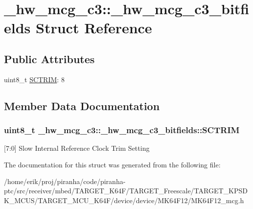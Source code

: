 \hypertarget{struct__hw__mcg__c3_1_1__hw__mcg__c3__bitfields}{}\section{\+\_\+hw\+\_\+mcg\+\_\+c3\+:\+:\+\_\+hw\+\_\+mcg\+\_\+c3\+\_\+bitfields Struct Reference}
\label{struct__hw__mcg__c3_1_1__hw__mcg__c3__bitfields}
\subsection*{Public Attributes}
\begin{DoxyCompactItemize}
\item 
uint8\+\_\+t \hyperlink{struct__hw__mcg__c3_1_1__hw__mcg__c3__bitfields_a3ddb5eccda673979cc87be98d8116d80}{S\+C\+T\+R\+IM}\+: 8
\end{DoxyCompactItemize}


\subsection{Member Data Documentation}
\subsubsection[{\texorpdfstring{S\+C\+T\+R\+IM}{SCTRIM}}]{\setlength{\rightskip}{0pt plus 5cm}uint8\+\_\+t \+\_\+hw\+\_\+mcg\+\_\+c3\+::\+\_\+hw\+\_\+mcg\+\_\+c3\+\_\+bitfields\+::\+S\+C\+T\+R\+IM}\hypertarget{struct__hw__mcg__c3_1_1__hw__mcg__c3__bitfields_a3ddb5eccda673979cc87be98d8116d80}{}\label{struct__hw__mcg__c3_1_1__hw__mcg__c3__bitfields_a3ddb5eccda673979cc87be98d8116d80}
\mbox{[}7\+:0\mbox{]} Slow Internal Reference Clock Trim Setting 

The documentation for this struct was generated from the following file\+:\begin{DoxyCompactItemize}
\item 
/home/erik/proj/piranha/code/piranha-\/ptc/src/receiver/mbed/\+T\+A\+R\+G\+E\+T\+\_\+\+K64\+F/\+T\+A\+R\+G\+E\+T\+\_\+\+Freescale/\+T\+A\+R\+G\+E\+T\+\_\+\+K\+P\+S\+D\+K\+\_\+\+M\+C\+U\+S/\+T\+A\+R\+G\+E\+T\+\_\+\+M\+C\+U\+\_\+\+K64\+F/device/device/\+M\+K64\+F12/M\+K64\+F12\+\_\+mcg.\+h\end{DoxyCompactItemize}

